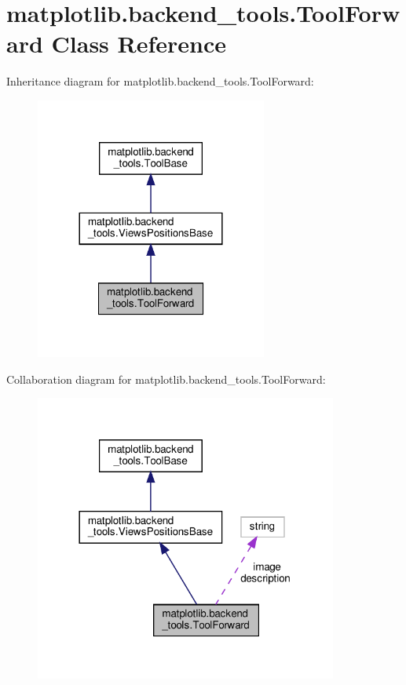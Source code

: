 \hypertarget{classmatplotlib_1_1backend__tools_1_1ToolForward}{}\section{matplotlib.\+backend\+\_\+tools.\+Tool\+Forward Class Reference}
\label{classmatplotlib_1_1backend__tools_1_1ToolForward}


Inheritance diagram for matplotlib.\+backend\+\_\+tools.\+Tool\+Forward\+:
\nopagebreak
\begin{figure}[H]
\begin{center}
\leavevmode
\includegraphics[width=216pt]{classmatplotlib_1_1backend__tools_1_1ToolForward__inherit__graph}
\end{center}
\end{figure}


Collaboration diagram for matplotlib.\+backend\+\_\+tools.\+Tool\+Forward\+:
\nopagebreak
\begin{figure}[H]
\begin{center}
\leavevmode
\includegraphics[width=282pt]{classmatplotlib_1_1backend__tools_1_1ToolForward__coll__graph}
\end{center}
\end{figure}
